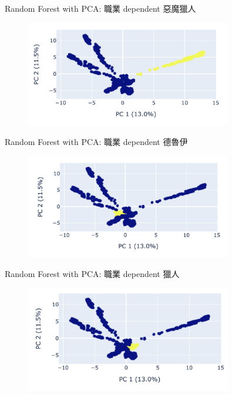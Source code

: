 \documentclass[12pt]{beamer}
\begin{document}
\begin{frame}[fragile]{Random Forest with PCA: 職業 dependent 惡魔獵人}
	\begin{figure}
		\begin{center}
			\includegraphics[width=0.8\textwidth]{figure/plot/2_DH.png}
		\end{center}
	\end{figure}
\end{frame}
\begin{frame}[fragile]{Random Forest with PCA: 職業 dependent 德魯伊}
	\begin{figure}
		\begin{center}
			\includegraphics[width=0.8\textwidth]{figure/plot/2_Druid.png}
		\end{center}
	\end{figure}
\end{frame}
\begin{frame}[fragile]{Random Forest with PCA: 職業 dependent 獵人}
	\begin{figure}
		\begin{center}
			\includegraphics[width=0.8\textwidth]{figure/plot/2_hunter.png}
		\end{center}
	\end{figure}
\end{frame}
\end{document}
